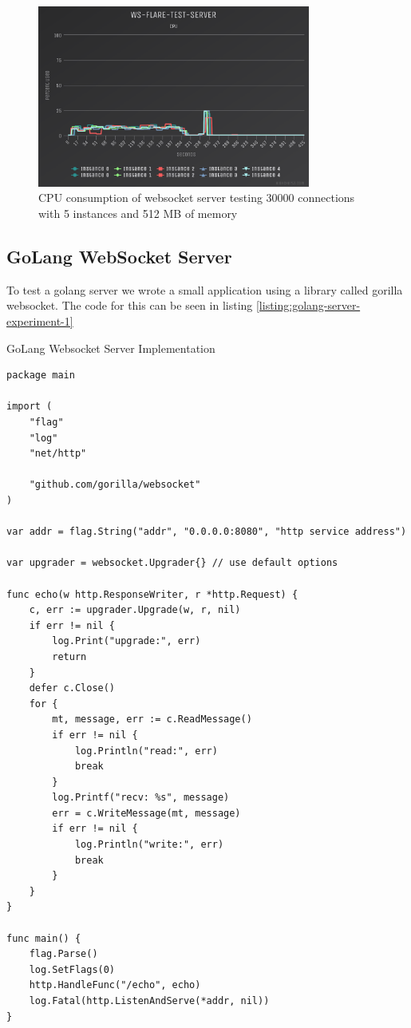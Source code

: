 \begin{figure}[H]
  \centering
    \includegraphics[width=0.8\textwidth]{figures/experiments/experiment-1/node-js/cpu-30000-5-instances-512-memory.png}
    \caption{CPU consumption of websocket server testing 30000 connections with 5 instances and 512 MB of memory}
    \label{fig:experiment-3-cpu-530000000-5-instances-512-mem}
\end{figure}

\subsection{GoLang WebSocket Server}

To test a golang server we wrote a small application using a library called gorilla websocket. The code for this can be seen in listing \ref{listing:golang-server-experiment-1}

\begin{listing}[H]
    \caption{GoLang Websocket Server Implementation}
    \label{listing:golang-server-experiment-1}
    \begin{verbatim}
package main

import (
	"flag"
	"log"
	"net/http"

	"github.com/gorilla/websocket"
)

var addr = flag.String("addr", "0.0.0.0:8080", "http service address")

var upgrader = websocket.Upgrader{} // use default options

func echo(w http.ResponseWriter, r *http.Request) {
	c, err := upgrader.Upgrade(w, r, nil)
	if err != nil {
		log.Print("upgrade:", err)
		return
	}
	defer c.Close()
	for {
		mt, message, err := c.ReadMessage()
		if err != nil {
			log.Println("read:", err)
			break
		}
		log.Printf("recv: %s", message)
		err = c.WriteMessage(mt, message)
		if err != nil {
			log.Println("write:", err)
			break
		}
	}
}

func main() {
	flag.Parse()
	log.SetFlags(0)
	http.HandleFunc("/echo", echo)
	log.Fatal(http.ListenAndServe(*addr, nil))
}
\end{verbatim}
\end{listing}


